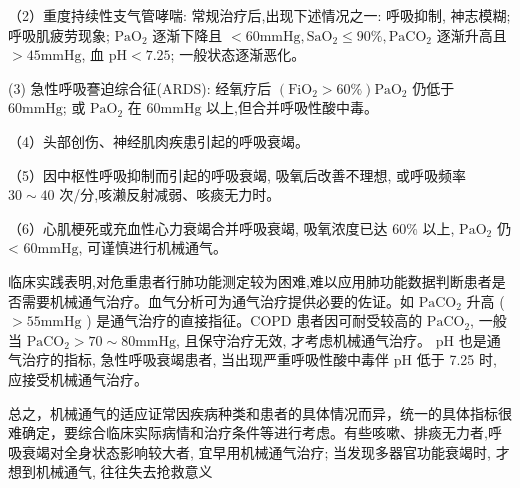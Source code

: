 \documentclass[10pt]{article}
\begin{document}
（2）重度持续性支气管哮喘: 常规治疗后,出现下述情况之一: 呼吸抑制, 神志模糊; 呼吸肌疲劳现象; $\mathrm{PaO}_{2}$ 逐渐下降且 $<60 \mathrm{mmHg}, \mathrm{SaO}_{2} \leqslant 90 \%, \mathrm{PaCO}_{2}$ 逐渐升高且 $>45 \mathrm{mmHg}$, 血 $\mathrm{pH}<7.25$; 一般状态逐渐恶化。

(3) 急性呼吸謇迫综合征(ARDS): 经氧疗后 $\left(\mathrm{FiO}_{2}>60 \%\right) \mathrm{PaO}_{2}$ 仍低于 $60 \mathrm{mmHg}$; 或 $\mathrm{PaO}_{2}$ 在 $60 \mathrm{mmHg}$ 以上,但合并呼吸性酸中毒。

（4）头部创伤、神经肌肉疾患引起的呼吸衰竭。

（5）因中枢性呼吸抑制而引起的呼吸衰竭, 吸氧后改善不理想, 或呼吸频率 $30 \sim 40$ 次/分,咳濑反射减弱、咳痰无力时。

（6）心肌梗死或充血性心力衰竭合并呼吸衰竭, 吸氧浓度已达 $60 \%$ 以上, $\mathrm{PaO}_{2}$ 仍 < $60 \mathrm{mmHg}$, 可谨慎进行机械通气。

临床实践表明,对危重患者行肺功能测定较为困难,难以应用肺功能数据判断患者是否需要机械通气治疗。血气分析可为通气治疗提供必要的佐证。如 $\mathrm{PaCO}_{2}$ 升高 ( $>55 \mathrm{mmHg}$ ) 是通气治疗的直接指征。COPD 患者因可耐受较高的 $\mathrm{PaCO}_{2}$, 一般当 $\mathrm{PaCO}_{2}>70 \sim 80 \mathrm{mmHg}$, 且保守治疗无效, 才考虑机械通气治疗。 $\mathrm{pH}$ 也是通气治疗的指标, 急性呼吸衰竭患者, 当出现严重呼吸性酸中毒伴 $\mathrm{pH}$ 低于 7.25 时, 应接受机械通气治疗。

总之，机械通气的适应证常因疾病种类和患者的具体情况而异，统一的具体指标很难确定，要综合临床实际病情和治疗条件等进行考虑。有些咳嗽、排痰无力者,呼吸衰竭对全身状态影响较大者, 宜早用机械通气治疗; 当发现多器官功能衰竭时, 才想到机械通气, 往往失去抢救意义
\end{document}
